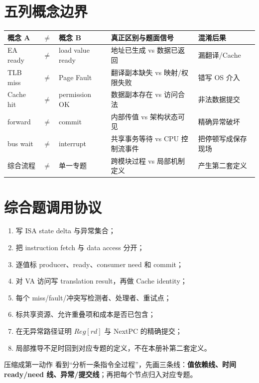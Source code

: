 \documentclass[UTF8,fontset=fandol,11pt,a4paper]{ctexart}
\newcommand{\kw}[1]{\textbf{\color{deep}#1}}
\begin{document}
\section{五列概念边界}
\begin{center}\small
\begin{tabularx}{\linewidth}{L{1.8cm}C{0.35cm}L{1.9cm}YY}\toprule
概念 A & $\neq$ & 概念 B & 真正区别与题面信号 & 混淆后果\\\midrule
EA ready & $\neq$ & load value ready & 地址已生成 vs 数据已返回 & 漏翻译/Cache\\
TLB miss & $\neq$ & Page Fault & 翻译副本缺失 vs 映射/权限失败 & 错写 OS 介入\\
Cache hit & $\neq$ & permission OK & 数据副本存在 vs 访问合法 & 非法数据提交\\
forward & $\neq$ & commit & 内部传值 vs 架构状态可见 & 精确异常破坏\\
bus wait & $\neq$ & interrupt & 共享事务等待 vs CPU 控制流事件 & 把停顿写成保存现场\\
综合流程 & $\neq$ & 单一专题 & 跨模块过程 vs 局部机制定义 & 产生第二套定义\\
\bottomrule
\end{tabularx}
\end{center}

\section{综合题调用协议}
\begin{enumerate}
\item 写 ISA state delta 与异常集合；
\item 把 instruction fetch 与 data access 分开；
\item 逐值标 producer、ready、consumer need 和 commit；
\item 对 VA 访问写 translation result，再做 Cache identity；
\item 每个 miss/fault/冲突写检测者、处理者、重试点；
\item 标共享资源、允许重叠项和成本是否已包含；
\item 在无异常路径证明 $Reg[rd]$ 与 NextPC 的精确提交；
\item 局部推导不足时回到对应专题的定义，不在本册补第二套定义。
\end{enumerate}

\begin{methodbox}{压缩成第一动作}
看到“分析一条指令全过程”，先画三条线：\kw{值依赖线、时间 ready/need 线、异常/提交线}；再把每个节点归入对应专题。
\end{methodbox}
\end{document}
